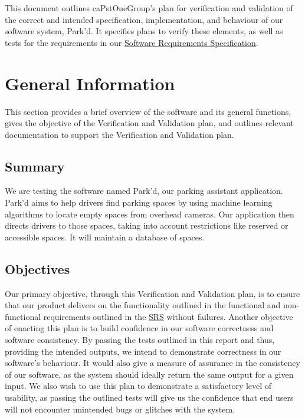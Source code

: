 \documentclass[12pt, titlepage]{article}
\begin{document}
This document outlines caPstOneGroup's plan for verification and validation of
the correct and intended specification, implementation, and behaviour of our
software system, Park'd. It specifies plans to verify these elements, as well as
tests for the requirements in our
\href{https://github.com/parkd-app/park-d/blob/main/docs/SRS/SRS.pdf}{Software
Requirements Specification}.

\section{General Information}
This section provides a brief overview of the software and its general
functions, gives the objective of the Verification and Validation plan, and
outlines relevant documentation to support the Verification and Validation plan.
\subsection{Summary}
We are testing the software named Park'd, our parking assistant application.
Park'd aims to help drivers find parking spaces by using machine learning
algorithms to locate empty spaces from overhead cameras. Our application then
directs drivers to those spaces, taking into account restrictions like reserved
or accessible spaces. It will maintain a database of spaces.


\subsection{Objectives}
Our primary objective, through this Verification and Validation plan, is to
ensure that our product delivers on the functionality outlined in the functional
and non-functional requirements outlined in the
\href{https://github.com/parkd-app/park-d/blob/main/docs/SRS/SRS.pdf}{SRS}
without failures. Another objective of enacting this plan is to build confidence
in our software correctness and software consistency. By passing the tests
outlined in this report and thus, providing the intended outputs, we intend to
demonstrate correctness in our software's behaviour. It would also give a
measure of assurance in the consistency of our software, as the system should
ideally return the same output for a given input. We also wish to use this plan
to demonstrate a satisfactory level of usability, as passing the outlined tests
will give us the confidence that end users will not encounter unintended bugs or
glitches with the system.
\end{document}

